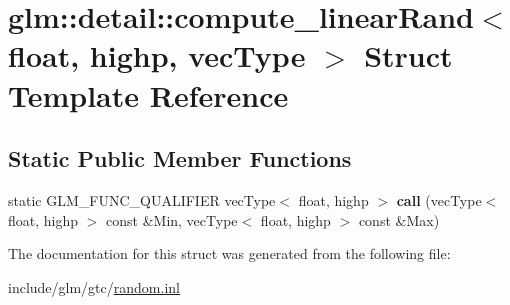\hypertarget{structglm_1_1detail_1_1compute__linearRand_3_01float_00_01highp_00_01vecType_01_4}{}\section{glm\+:\+:detail\+:\+:compute\+\_\+linear\+Rand$<$ float, highp, vec\+Type $>$ Struct Template Reference}
\label{structglm_1_1detail_1_1compute__linearRand_3_01float_00_01highp_00_01vecType_01_4}
\subsection*{Static Public Member Functions}
\begin{DoxyCompactItemize}
\item 
\mbox{\label{structglm_1_1detail_1_1compute__linearRand_3_01float_00_01highp_00_01vecType_01_4_a1ac79c6d4365ce29a99e45327d51ec47}} 
static G\+L\+M\+\_\+\+F\+U\+N\+C\+\_\+\+Q\+U\+A\+L\+I\+F\+I\+ER vec\+Type$<$ float, highp $>$ {\bfseries call} (vec\+Type$<$ float, highp $>$ const \&Min, vec\+Type$<$ float, highp $>$ const \&Max)
\end{DoxyCompactItemize}


The documentation for this struct was generated from the following file\+:\begin{DoxyCompactItemize}
\item 
include/glm/gtc/\hyperlink{random_8inl}{random.\+inl}\end{DoxyCompactItemize}
